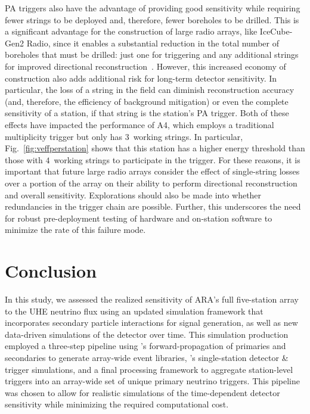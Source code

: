   PA triggers also have the advantage of providing good sensitivity while requiring fewer strings to be deployed and, therefore, fewer boreholes to be drilled.
  This is a significant advantage for the construction of large radio arrays, like IceCube-Gen2 Radio, since it enables a substantial reduction in the total number of boreholes that must be drilled: just one for triggering and any additional strings for improved directional reconstruction~\citep{phased-array-concept}.
  However, this increased economy of construction also adds additional risk for long-term detector sensitivity.
  In particular, the loss of a string in the field can diminish reconstruction accuracy (and, therefore, the efficiency of background mitigation) or even the complete sensitivity of a station, if that string is the station's PA trigger.
  Both of these effects have impacted the performance of A4, which employs a traditional multiplicity trigger but only has $3$~working strings.
  In particular, Fig.~\ref{fig:veffperstation} shows that this station has a higher energy threshold than those with $4$~working strings to participate in the trigger.
  For these reasons, it is important that future large radio arrays consider the effect of single-string losses over a portion of the array on their ability to perform directional reconstruction and overall sensitivity.
  Explorations should also be made into whether redundancies in the trigger chain are possible.
  Further, this underscores the need for robust pre-deployment testing of hardware and on-station software to minimize the rate of this failure mode.
        
\section{Conclusion}\label{sec:veffpaper_conclusion}

  In this study, we assessed the realized sensitivity of ARA's full five-station array to the UHE neutrino flux using an updated simulation framework that incorporates secondary particle interactions for signal generation, as well as new data-driven simulations of the detector over time.
  This simulation production employed a three-step pipeline using \nuleptonsim{}'s forward-propagation of primaries and secondaries to generate array-wide event libraries, \arasim{}'s single-station detector \& trigger simulations, and a final processing framework to aggregate station-level triggers into an array-wide set of unique primary neutrino triggers.
  This pipeline was chosen to allow for realistic simulations of the time-dependent detector sensitivity while minimizing the required computational cost.

